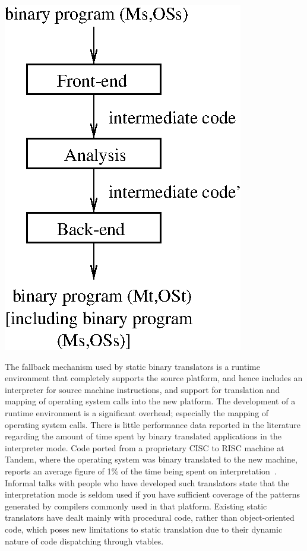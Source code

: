 \centerfigbegin
\resizebox{!}{6cm}
{\includegraphics{figures/static.eps}}
 
The fallback mechanism used by static binary translators is a runtime
environment that completely supports the source platform, and
hence includes an interpreter for source machine instructions, and support
for translation and mapping of operating system calls into the new
platform.  The development of a runtime environment is a significant
overhead; especially the mapping of operating system calls.  There is
little performance data reported in the literature regarding the amount of
time spent by binary translated applications in the interpreter mode.
Code ported from a proprietary CISC to RISC machine at Tandem, where the
operating system was binary translated to the new machine, reports an
average figure of 1\% of the time being spent on interpretation~\cite{Andr92}.
Informal talks with people who have developed such translators state that
the interpretation mode is seldom used if you have sufficient coverage 
of the patterns generated by compilers commonly used in that platform. 
Existing static translators have dealt mainly with procedural code, 
rather than object-oriented code, which poses new limitations to static
translation due to their dynamic nature of code dispatching through 
vtables.  
 
